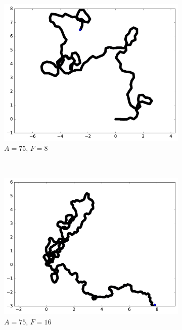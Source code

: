 \begin{figure}[htb]
\begin{subfigure}[t]{\subImgWmo}
			\centering
			\includegraphics[width=\textwidth]{figures/ch3/synTraj_219_75_8}
			\caption[$A = 75$, $F=8$]{$A = 75$, $F=8$}
			\label{fig:synTraj_219_75_8}
		\end{subfigure}
		~
		\begin{subfigure}[t]{\subImgWmo}
			\centering
			\includegraphics[width=\textwidth]{figures/ch3/synTraj_219_75_16}
			\caption[$A = 75$, $F=16$]{$A = 75$, $F=16$}
			\label{fig:synTraj_219_75_16}
		\end{subfigure}
		~
		\begin{subfigure}[t]{\subImgWmo}
			\centering

\end{subfigure}
\end{figure}
